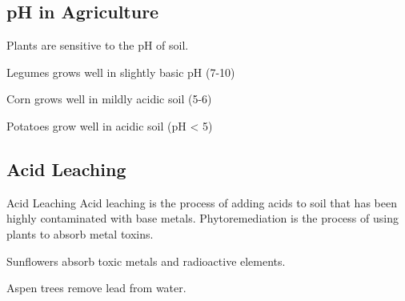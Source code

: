\documentclass[12pt]{report}
\begin{document}
\subsection{pH in Agriculture}
Plants are sensitive to the pH of soil. 
\begin{list0.5}
    \item{Legumes grows well in slightly basic pH (7-10)}
    \item{Corn grows well in mildly acidic soil (5-6)}
    \item{Potatoes grow well in acidic soil (pH < 5)}
\end{list0.5}

\subsection{Acid Leaching}
\begin{definition}{Acid Leaching}
    Acid leaching is the process of adding acids to soil that has been highly contaminated with base metals. Phytoremediation is the process of using plants to absorb metal toxins. 
\end{definition}

\begin{2example}{ }
\invis
\begin{list0.5}
    \item{Sunflowers absorb toxic metals and radioactive elements.}
    \item{Aspen trees remove lead from water.}
\end{list0.5}
\end{2example}
\end{document}
